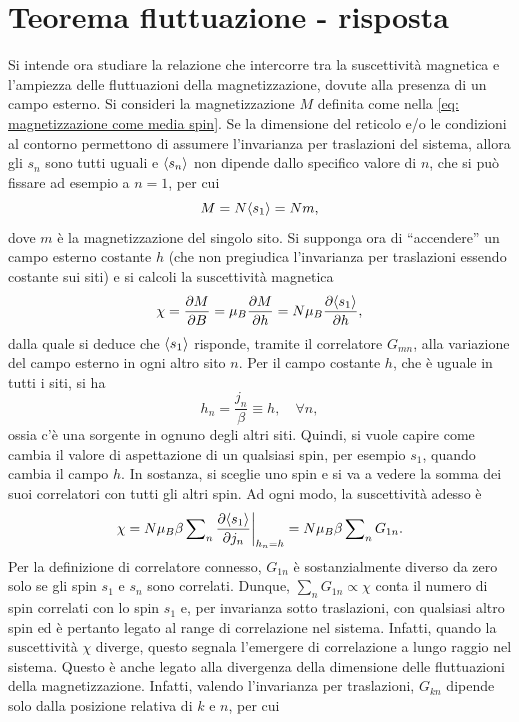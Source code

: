 \section{Teorema fluttuazione - risposta}
Si intende ora studiare la relazione che intercorre tra la suscettività magnetica e l'ampiezza delle fluttuazioni della magnetizzazione, dovute alla presenza di un campo esterno. Si consideri la magnetizzazione $M$ definita come nella \eqref{eq: magnetizzazione come media spin}. Se la dimensione del reticolo e/o le condizioni al contorno permettono di assumere l'invarianza per traslazioni del sistema, allora gli $s_n$ sono tutti uguali e $\langle s_n \rangle$ non dipende dallo specifico valore di $n$, che si può fissare ad esempio a $n = 1$, per cui 
\begin{equation}
    M = N \langle s_1 \rangle = Nm,
\end{equation}
dove $m$ è la magnetizzazione del singolo sito. Si supponga ora di ``accendere'' un campo esterno costante $h$ (che non pregiudica l'invarianza per traslazioni essendo costante sui siti) e si calcoli la suscettività magnetica
\begin{equation}
    \chi = \frac{\partial M}{\partial B} = \mu_B \frac{\partial M}{\partial h} = N \mu_B \frac{\partial \langle s_1 \rangle}{\partial h},
\end{equation}
dalla quale si deduce che $\langle s_1 \rangle$ risponde, tramite il correlatore $G_{mn}$, alla variazione del campo esterno in ogni altro sito $n$. Per il campo costante $h$, che è uguale in tutti i siti, si ha
\begin{equation}
    h_n = \frac{j_n}{\beta} \equiv h,\quad \forall n,
\end{equation}
ossia c'è una sorgente in ognuno degli altri siti. Quindi, si vuole capire come cambia il valore di aspettazione di un qualsiasi spin, per esempio $s_1$, quando cambia il campo $h$. In sostanza, si sceglie uno spin e si va a vedere la somma dei suoi correlatori con tutti gli altri spin. Ad ogni modo, la suscettività adesso è
\begin{equation}
    \chi = N \mu_B \beta \sum\nolimits_n\frac{\partial \langle s_1 \rangle}{\partial j_n} \bigg|_{h_n = h} = N \mu_B \beta \sum\nolimits_n G_{1n}.
\end{equation}
 Per la definizione di correlatore connesso, $G_{1n}$ è sostanzialmente diverso da zero solo se gli spin $s_1$ e $s_n$ sono correlati. Dunque, $\sum_n G_{1n} \propto \chi$ conta il numero di spin correlati con lo spin $s_1$ e, per invarianza sotto traslazioni, con qualsiasi altro spin ed è pertanto legato al range di correlazione nel sistema. Infatti, quando la suscettività $\chi$ diverge, questo segnala l'emergere di correlazione a lungo raggio nel sistema. Questo è anche legato alla divergenza della dimensione delle fluttuazioni della magnetizzazione. Infatti, valendo l'invarianza per traslazioni, $G_{kn}$ dipende solo dalla posizione relativa di $k$ e $n$, per cui
